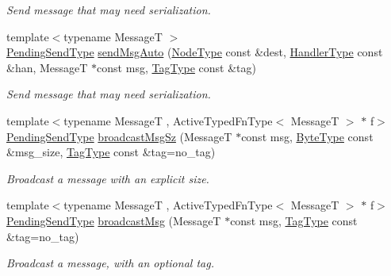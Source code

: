 \begin{DoxyCompactItemize}
\begin{DoxyCompactList}\small\item\em Send message that may need serialization. \end{DoxyCompactList}\item 
{\footnotesize template$<$typename MessageT $>$ }\\\hyperlink{structvt_1_1messaging_1_1_active_messenger_a3626a6ca76d8ad4ec7c3b47a2c70d3a8}{Pending\+Send\+Type} \hyperlink{group__preregister_gab6320b24ec0e640634b5394691ea9819}{send\+Msg\+Auto} (\hyperlink{namespacevt_a866da9d0efc19c0a1ce79e9e492f47e2}{Node\+Type} const \&dest, \hyperlink{namespacevt_af64846b57dfcaf104da3ef6967917573}{Handler\+Type} const \&han, MessageT $\ast$const msg, \hyperlink{namespacevt_a84ab281dae04a52a4b243d6bf62d0e52}{Tag\+Type} const \&tag)
\begin{DoxyCompactList}\small\item\em Send message that may need serialization. \end{DoxyCompactList}\item 
{\footnotesize template$<$typename MessageT , Active\+Typed\+Fn\+Type$<$ Message\+T $>$ $\ast$ f$>$ }\\\hyperlink{structvt_1_1messaging_1_1_active_messenger_a3626a6ca76d8ad4ec7c3b47a2c70d3a8}{Pending\+Send\+Type} \hyperlink{group__typesafehan_ga85e49835912df14e08378b08378e1513}{broadcast\+Msg\+Sz} (MessageT $\ast$const msg, \hyperlink{namespacevt_aab8d55968084610ce3b17057981e9300}{Byte\+Type} const \&msg\+\_\+size, \hyperlink{namespacevt_a84ab281dae04a52a4b243d6bf62d0e52}{Tag\+Type} const \&tag=no\+\_\+tag)
\begin{DoxyCompactList}\small\item\em Broadcast a message with an explicit size. \end{DoxyCompactList}\item 
{\footnotesize template$<$typename MessageT , Active\+Typed\+Fn\+Type$<$ Message\+T $>$ $\ast$ f$>$ }\\\hyperlink{structvt_1_1messaging_1_1_active_messenger_a3626a6ca76d8ad4ec7c3b47a2c70d3a8}{Pending\+Send\+Type} \hyperlink{group__typesafehan_gadad0627a27bd7be174369cf14296afad}{broadcast\+Msg} (MessageT $\ast$const msg, \hyperlink{namespacevt_a84ab281dae04a52a4b243d6bf62d0e52}{Tag\+Type} const \&tag=no\+\_\+tag)
\begin{DoxyCompactList}\small\item\em Broadcast a message, with an optional tag. \end{DoxyCompactList}\item 

\end{DoxyCompactItemize}

